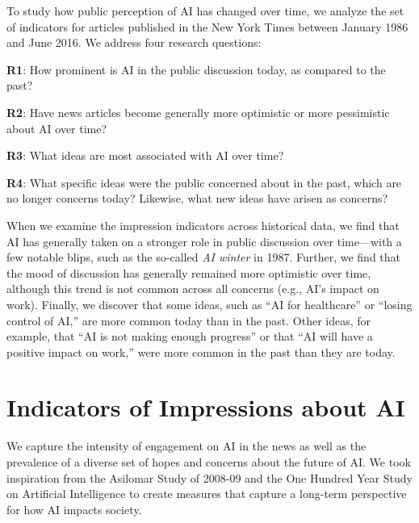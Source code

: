 \documentclass[letterpaper]{article}
\begin{document}
To study how public perception of AI has changed over time, we analyze the set of indicators for articles published in the New York Times between January 1986 and June 2016. We address four research questions:

\textbf{R1}: How prominent is AI in the public discussion today, as compared to the past? %

\textbf{R2}: Have news articles become generally more optimistic or more pessimistic about AI over time? %

\textbf{R3}: What ideas are most associated with AI over time? %

\textbf{R4}: What specific ideas were the public concerned about in the past, which are no longer concerns today? Likewise, what new ideas have arisen as concerns?

When we examine the impression indicators across historical data, we find that AI has generally taken on a stronger role in public discussion over time---with a few notable blips, such as the so-called \textit{AI winter} in 1987. Further, we find that the mood of discussion has generally remained more optimistic over time, although this trend is not common across all concerns (e.g., AI's impact on work). Finally, we discover that some ideas, such as ``AI for healthcare'' or ``losing control of AI,'' are more common today than in the past. Other ideas, for example, that ``AI is not making enough progress'' or that ``AI will have a positive impact on work,'' were more common in the past than they are today.

\section{Indicators of Impressions about AI}


We capture the intensity of engagement on AI in the news as well as the prevalence of a diverse set of hopes and concerns about the future of AI. We took inspiration from the Asilomar Study of 2008-09 \cite{asilomar} and the One Hundred Year Study on Artificial Intelligence \cite{100years} to create measures that capture a long-term perspective for how AI impacts society. %
\end{document}
